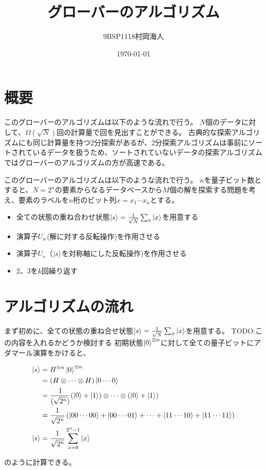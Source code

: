 \documentclass[platex,dvipdfmx]{jlreq}			%
\title{グローバーのアルゴリズム}
\author{9BSP1118村岡海人}
\date{\today}
\begin{document}
    \maketitle

    \section{概要}
    このグローバーのアルゴリズムは以下のような流れで行う。
    $N$個のデータに対して、$\Omega(\sqrt{N})$回の計算量で回を見出すことができる。
    古典的な探索アルゴリズムにも同じ計算量を持つ2分探索があるが、2分探索アルゴリズムは事前にソートされているデータを扱うため、ソートされていないデータの探索アルゴリズムではグローバーのアルゴリズムの方が高速である。

    このグローバーのアルゴリズムは以下のような流れで行う。
    $n$を量子ビット数とすると、$N = 2^n$の要素からなるデータベースから$M$個の解を探索する問題を考え、要素のラベルを$n$桁のビット列$x = x_1 \cdots x_n$とする。

    \begin{itemize}
        \item 全ての状態の重ね合わせ状態$\ket{s} = \frac{1}{\sqrt{N}} \sum_x \ket{x}$を用意する 
        \item 演算子$U_w$(解に対する反転操作)を作用させる 
        \item 演算子$U_s$（$\ket{s}$を対称軸にした反転操作)を作用させる 
        \item 2、3を$k$回繰り返す 
    \end{itemize}

    \section{アルゴリズムの流れ}
    まず初めに、全ての状態の重ね合せ状態$\ket{s} = \frac{1}{\sqrt{N}} \sum_x \ket{x}$を用意する。
    TODO:この内容を入れるかどうか検討する
    初期状態$\ket{0}^{\otimes n}$に対して全ての量子ビットにアダマール演算をかけると、

    \begin{equation}
        \begin{split}
        \ket{s} &= H^{\otimes n} \ket{0}^{\otimes n} \\ 
        &= (H \otimes \cdots \otimes H)\ket{0\cdots0} \\
        &= \frac{1}{(\sqrt{2^n})} (\ket{0} + \ket{1})\otimes\cdots\otimes (\ket{0} + \ket{1}) \\
        &= \frac{1}{\sqrt{2^n}} \left( \ket{00 \cdots 00} + \ket{00 \cdots 01} + \cdots + \ket{11 \cdots 10} + \ket{11 \cdots 11}\right) \\
        \ket{s} &= \frac{1}{\sqrt{2^n}} \sum^{2^n - 1}_{x = 0} \ket{x}
        \end{split}
    \end{equation}

    のように計算できる。
\end{document}
